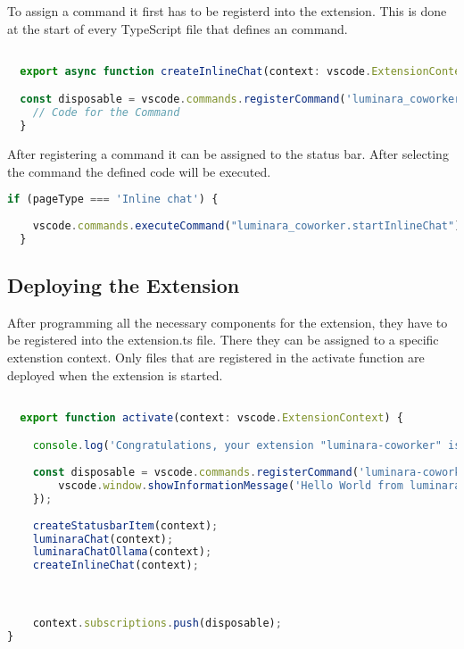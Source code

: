 To assign a command it first has to be registerd into the extension. This is done at the start of every TypeScript file that defines an command.

\begin{lstlisting}[language=TypeScript, caption={registering Command}]

  export async function createInlineChat(context: vscode.ExtensionContext ) {

  const disposable = vscode.commands.registerCommand('luminara_coworker.startInlineChat', () => {
    // Code for the Command
  }
\end{lstlisting}


After registering a command it can be assigned to the status bar. After selecting the command the defined code will be executed.

\begin{lstlisting}[language=TypeScript, caption={assigning Command}]
  if (pageType === 'Inline chat') {
        
    vscode.commands.executeCommand("luminara_coworker.startInlineChat");
  }
\end{lstlisting}
    

\subsection{Deploying the Extension}

After programming all the necessary components for the extension, they have to be registered into the extension.ts file.
There they can be assigned to a specific extenstion context. Only files that are registered in the activate function are deployed when the extension is started.

\begin{lstlisting}[language=TypeScript, caption={Deploying the Extension}]

  export function activate(context: vscode.ExtensionContext) {

	console.log('Congratulations, your extension "luminara-coworker" is now active!');
	
	const disposable = vscode.commands.registerCommand('luminara-coworker.helloWorld', () => {
		vscode.window.showInformationMessage('Hello World from luminara_coworker!');
	});
			
	createStatusbarItem(context);
	luminaraChat(context);
	luminaraChatOllama(context);
	createInlineChat(context);



	context.subscriptions.push(disposable);
}
\end{lstlisting}



